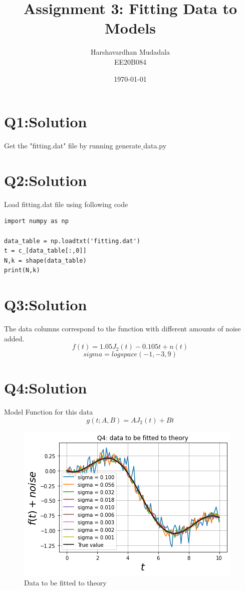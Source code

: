 \documentclass[11pt, a4paper]{article}
\title{Assignment 3: Fitting Data to Models} %
\author{Harshavardhan Mudadala\\
			EE20B084} %
\date{\today} %
\begin{document}
\maketitle %

\section*{Q1:Solution}
Get the "fitting.dat" file by running generate$\_$data.py

\section*{Q2:Solution}
Load fitting.dat file using following code
\begin{verbatim}	
import numpy as np

data_table = np.loadtxt('fitting.dat')
t = c_[data_table[:,0]]
N,k = shape(data_table)
print(N,k)
\end{verbatim} 

\section*{Q3:Solution}
The data columns correspond to the function with different amounts of noise added.\\
\begin{equation*}
 f(t) = 1.05J_{2}(t)-0.105t+n(t)
\end{equation*}
\begin{equation*}
 sigma = logspace(-1,-3,9)
\end{equation*}

\section*{Q4:Solution}
Model Function for this data 
\begin{equation*}
 g(t; A, B) = AJ_{2}(t) + Bt
\end{equation*}
\begin{figure}[!tbh]
   	\centering
   	\includegraphics[scale=0.5]{Q4plot.png}  %
   	\caption{Data to be fitted to theory}
   \end{figure} 
\end{document}
